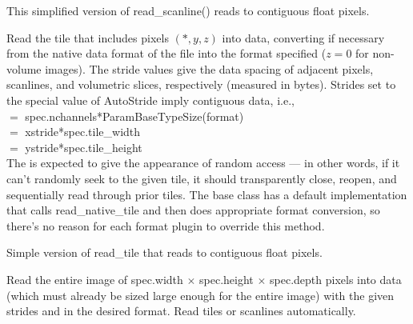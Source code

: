 This simplified version of {\kw read_scanline()} reads to contiguous 
float pixels.
\apiend

Read the tile that includes pixels $(*,y,z)$ into {\kw data}, converting
if necessary from the native data format of the file into the 
{\kw format} specified ($z=0$ for non-volume images).  The stride values
give the data spacing of adjacent pixels, scanlines, and volumetric
slices, respectively (measured in bytes).  Strides set to the special
value of {\kw AutoStride} imply contiguous data, i.e., \\
 $=$ {\kw spec.nchannels*ParamBaseTypeSize(format)} \\
 $=$ {\kw xstride*spec.tile_width} \\
 $=$ {\kw ystride*spec.tile_height} \\
The \ImageInput is expected to give the appearance of random access
--- in other words, if it can't randomly seek to the given tile, it
should transparently close, reopen, and sequentially read through prior
tiles.  The base \ImageInput class has a default implementation
that calls read_native_tile and then does appropriate format conversion,
so there's no reason for each format plugin to override this method.
\apiend


Simple version of {\kw read_tile} that reads to contiguous float pixels.
\apiend


Read the entire image of {\kw spec.width} $\times$ {\kw spec.height}
$\times$ {\kw spec.depth}
pixels into data (which must already be sized large enough for
the entire image) with the given strides and in the desired
format.  Read tiles or scanlines automatically.  

